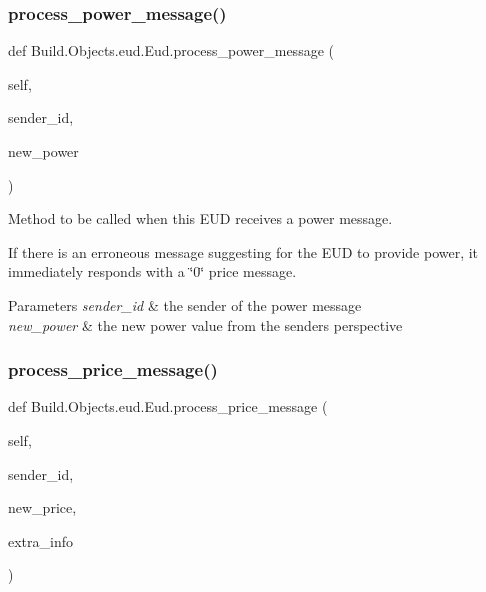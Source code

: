 \subsubsection{\texorpdfstring{process\+\_\+power\+\_\+message()}{process\_power\_message()}}
{\footnotesize\ttfamily def Build.\+Objects.\+eud.\+Eud.\+process\+\_\+power\+\_\+message (\begin{DoxyParamCaption}\item[{}]{self,  }\item[{}]{sender\+\_\+id,  }\item[{}]{new\+\_\+power }\end{DoxyParamCaption})}



Method to be called when this E\+UD receives a power message. 

If there is an erroneous message suggesting for the E\+UD to provide power, it immediately responds with a \char`\"{}0\char`\"{} price message. 
\begin{DoxyParams}{Parameters}
{\em sender\+\_\+id} & the sender of the power message \\
\hline
{\em new\+\_\+power} & the new power value from the sender\textquotesingle{}s perspective \\
\hline
\end{DoxyParams}
\mbox{\label{class_build_1_1_objects_1_1eud_1_1_eud_abef38cebc5b66f6cb03f58f2900b9a93}} 
\subsubsection{\texorpdfstring{process\+\_\+price\+\_\+message()}{process\_price\_message()}}
{\footnotesize\ttfamily def Build.\+Objects.\+eud.\+Eud.\+process\+\_\+price\+\_\+message (\begin{DoxyParamCaption}\item[{}]{self,  }\item[{}]{sender\+\_\+id,  }\item[{}]{new\+\_\+price,  }\item[{}]{extra\+\_\+info }\end{DoxyParamCaption})}



